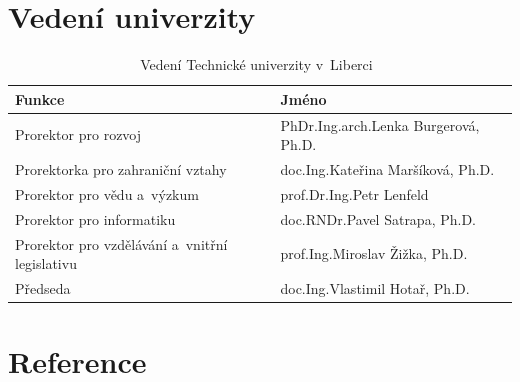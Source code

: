 \documentclass[a4paper,12pt,fonts,nocapnumbers,listingsleft]{./tulpackage/tularticle}
\newcommand{\custombibliography}{
    \vspace{2mm}
    \section*{Reference}
    \vspace{4mm}
    \printbibliography[heading=none]
}
\begin{document}
\section{Vedení univerzity}

\vspace{-0.6em}
\begin{table}[H]
    \small
    \begin{tabular}{ll}
        \toprule
        \textbf{Funkce}                        & \textbf{Jméno}                                           \\
        \midrule
        Prorektor pro rozvoj                   & PhDr.\thinspace{}Ing.\thinspace{}arch.\thinspace{}Lenka Burgerová, Ph.D. \\
        Prorektorka pro zahraniční vztahy      & doc.\thinspace{}Ing.\thinspace{}Kateřina Maršíková, Ph.D.                 \\
        Prorektor pro vědu a~výzkum            & prof.\thinspace{}Dr.\thinspace{}Ing.\thinspace{}Petr Lenfeld             \\
        Prorektor pro informatiku              & doc.\thinspace{}RNDr.\thinspace{}Pavel Satrapa, Ph.D.                     \\
        Prorektor pro vzdělávání a~vnitřní legislativu & prof.\thinspace{}Ing.\thinspace{}Miroslav Žižka, Ph.D.                    \\
        Předseda                               & doc.\thinspace{}Ing.\thinspace{}Vlastimil Hotař, Ph.D.                    \\
        \bottomrule
    \end{tabular}
    \caption{Vedení Technické univerzity v~Liberci~\cite{vyrocnizprava}}\label{tab:vedeni}
\end{table}

\clearpage

\custombibliography{}
\end{document}

